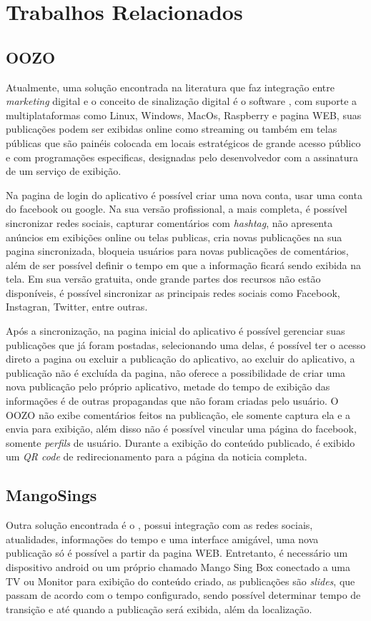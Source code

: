 \chapter[Trabalhos Relacionados]{Trabalhos Relacionados}
\section{OOZO}
Atualmente, uma solução encontrada na literatura que faz integração entre \textit{marketing} digital e o conceito de sinalização digital é o software \cite{oozo2017}, com suporte a multiplataformas como Linux, Windows, MacOs, Raspberry e pagina WEB, suas publicações podem ser exibidas online como streaming ou também em telas públicas que são painéis colocada em locais estratégicos de grande acesso público e com programações especificas, designadas pelo desenvolvedor com a assinatura de um serviço de exibição.

Na pagina de login do aplicativo é possível criar uma nova conta, usar uma conta do facebook ou google. Na sua versão profissional, a mais completa, é possível sincronizar redes sociais, capturar comentários com \textit{hashtag}, não apresenta anúncios em exibições online ou telas publicas, cria novas publicações na sua pagina sincronizada, bloqueia usuários para novas publicações de comentários, além de ser possível definir o tempo em que a informação ficará sendo exibida na tela. Em sua versão gratuita, onde grande partes dos recursos não estão disponíveis, é possível sincronizar as principais redes sociais como Facebook, Instagran, Twitter, entre outras. 

Após a sincronização, na pagina inicial do aplicativo é possível gerenciar suas publicações que já foram postadas, selecionando uma delas, é possível ter o acesso direto a pagina ou excluir a publicação do aplicativo, ao excluir do aplicativo, a publicação não é excluída da pagina, não oferece a possibilidade de criar uma nova publicação pelo próprio aplicativo, metade do tempo de exibição das informações é de outras propagandas que não foram criadas pelo usuário. O OOZO não exibe comentários feitos na publicação, ele somente captura ela e a envia para exibição, além disso não é possível vincular uma página do facebook, somente \textit{perfils} de usuário. Durante a exibição do conteúdo publicado, é exibido um \textit{QR code} de redirecionamento para a página da noticia completa.

\section{MangoSings}
Outra solução encontrada é o \cite{mango2017}, possui integração com as redes sociais, atualidades, informações do tempo e uma interface amigável, uma nova publicação só é possível a partir da pagina WEB. Entretanto, é necessário um dispositivo android ou um próprio chamado Mango Sing Box conectado a uma TV ou Monitor para exibição do conteúdo criado, as publicações são \textit{slides}, que passam de acordo com o tempo configurado, sendo possível determinar tempo de transição e até quando a publicação será exibida, além da localização. 

